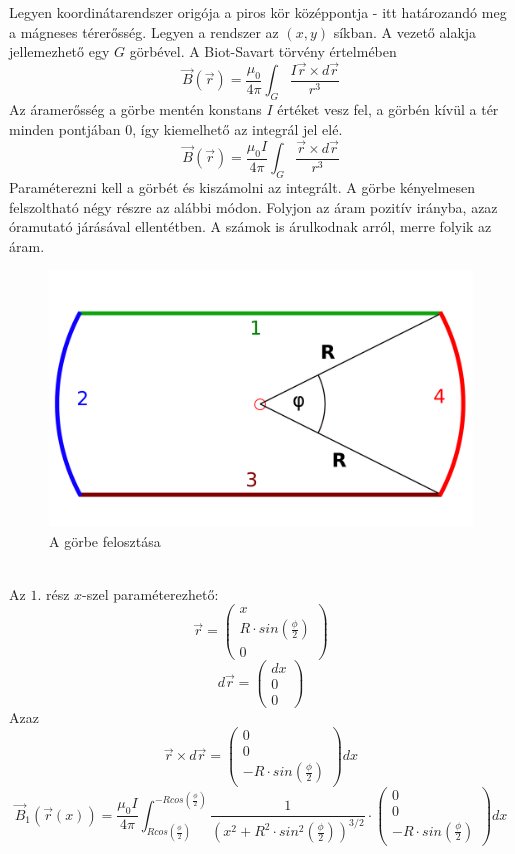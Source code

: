 \documentclass[11pt,a4paper,openany,leqno]{article}
\begin{document}
Legyen koordinátarendszer origója a piros kör középpontja - itt határozandó meg a mágneses térerősség. Legyen a rendszer az $(x,y)$ síkban. A vezető alakja jellemezhető egy $G$ görbével. A Biot-Savart törvény értelmében
$$ \vec{B}(\vec{r}) = \frac{\mu_0}{4\pi}\int_{G} \frac{I \vec{r} \times d\vec{r}}{r^3} $$
\indent
Az áramerősség a görbe mentén konstans $I$ értéket vesz fel, a görbén kívül a tér minden pontjában $0$, így kiemelhető az integrál jel elé.
$$ \vec{B}(\vec{r}) = \frac{\mu_0 I}{4\pi}\int_{G} \frac{\vec{r} \times d\vec{r}}{r^3} $$
\newpage
\indent
Paraméterezni kell a görbét és kiszámolni az integrált. A görbe kényelmesen felszoltható négy részre az alábbi módon. Folyjon az áram pozitív irányba, azaz óramutató járásával ellentétben. A számok is árulkodnak arról, merre folyik az áram.
\begin{figure}[h!]
\centering
  \includegraphics[width=120mm,scale=0.5]{felosztas.pdf}
  \caption{A görbe felosztása}
  \label{}
\end{figure} \\
\indent
Az $1.$ rész $x$-szel paraméterezhető:
$$ \vec{r} = \begin{pmatrix} x \\ R\cdot sin(\frac{\phi}{2}) \\ 0 \end{pmatrix} $$
$$ d\vec{r} = \begin{pmatrix} dx \\ 0 \\ 0 \end{pmatrix} $$
\indent
Azaz
$$ \vec{r} \times d\vec{r} = \begin{pmatrix} 0 \\ 0 \\ - R\cdot sin(\frac{\phi}{2}) \end{pmatrix} dx $$
$$ \vec{B}_1(\vec{r}(x)) = \frac{\mu_0 I}{4\pi}\int_{R cos(\frac{\phi}{2})}^{-Rcos(\frac{\phi}{2})} \frac{1}{(x^2 + R^2 \cdot sin^2 (\frac{\phi}{2}))^{3/2}}\cdot \begin{pmatrix} 0 \\ 0 \\ - R\cdot sin(\frac{\phi}{2}) \end{pmatrix} dx $$
\end{document}
